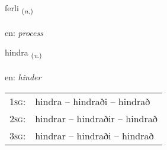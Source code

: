 \documentclass[frontgrid, backgrid]{flacards}\usepackage[]{graphicx}\usepackage[]{xcolor}
\begin{document}
\renewcommand{\flhead}{\vskip5pt \fboxsep=0pt {\small\bfseries\footnotesize Nafnorð | Noun}}
\renewcommand{\fcfoot}{\vskip5pt \fboxsep=0pt \hspace{2pt}{\small\bfseries\footnotesize 3K}}

\renewcommand{\blhead}{\vskip5pt {\small\bfseries\footnotesize Nafnorð | Noun }}
\renewcommand{\bcfoot}{\vskip5pt \hspace{2pt}{\small\bfseries\footnotesize 3K}}


{ferli \small{\textsubscript{(\textit{n.})}} \\[1ex] %
\textphonetic{[fɛrtlɪ]} \\
en: \emph{process} \\  [2ex]
\renewcommand*{\arraystretch}{0.8}
}

\renewcommand{\flhead}{\vskip5pt \fboxsep=0pt {\small\bfseries\footnotesize Sagnorð | Verb}}
\renewcommand{\fcfoot}{\vskip5pt \fboxsep=0pt \hspace{2pt}{\small\bfseries\footnotesize 3K}}

\renewcommand{\blhead}{\vskip5pt {\small\bfseries\footnotesize Sagnorð | Verb }}
\renewcommand{\bcfoot}{\vskip5pt \hspace{2pt}{\small\bfseries\footnotesize 3K}}


{hindra \small{\textsubscript{(\textit{v.})}} \\[1ex] %
\textphonetic{[hɪntra]} \\
en: \emph{hinder} \\  [2ex]
\renewcommand*{\arraystretch}{0.8}
\begin{tabular}{p{1cm}l}
\textsc{1sg}: & hindra -- hindraði -- hindrað \\ 
\textsc{2sg}: & hindrar -- hindraðir -- hindrað \\ 
\textsc{3sg}: & hindrar -- hindraði -- hindrað \\ 
\end{tabular}
}
\end{document}
